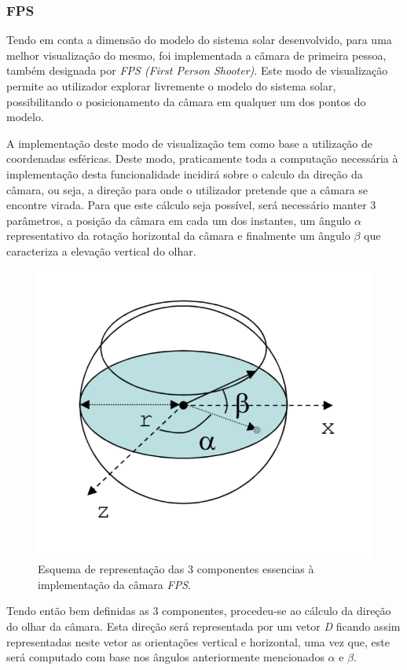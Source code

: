 \documentclass[a4paper]{article}
\begin{document}
\subsubsection{FPS} %

\hspace{3mm} Tendo em conta a dimensão do modelo do sistema solar desenvolvido, para uma melhor visualização do mesmo, foi implementada a câmara de primeira pessoa, também designada por \textit{FPS (First Person Shooter)}. Este modo de visualização permite ao utilizador explorar livremente o modelo do sistema solar, possibilitando o posicionamento da câmara em qualquer um dos pontos do modelo.

A implementação deste modo de visualização tem como base a utilização de coordenadas esféricas. Deste modo, praticamente toda a computação necessária à implementação desta funcionalidade incidirá sobre o calculo da direção da câmara, ou seja, a direção para onde o utilizador pretende que a câmara se encontre virada. Para que este cálculo seja possível, será necessário manter 3 parâmetros, a posição da câmara em cada um dos instantes, um ângulo $\alpha$ representativo da rotação horizontal da câmara e finalmente um ângulo $\beta$ que caracteriza a elevação vertical do olhar.

\begin{figure}[!h]
    \centering
    \includegraphics[width=0.5\linewidth]{referencial_FPS.png}
    \caption{Esquema de representação das 3 componentes essencias à implementação da câmara \textit{FPS}.}
    \label{fig:ref_FPS}
\end{figure}

Tendo então bem definidas as 3 componentes, procedeu-se ao cálculo da direção do olhar da câmara. Esta direção será representada por um vetor \textit{D} ficando assim representadas neste vetor as orientações vertical e horizontal, uma vez que, este será computado com base nos ângulos anteriormente mencionados $\alpha$ e $\beta$.
\end{document}
